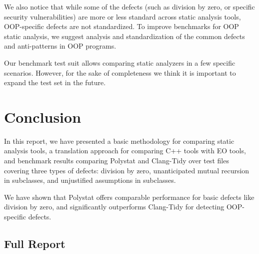 We also notice that while some of the defects (such as division by zero, or specific security vulnerabilities) are more or less standard across static analysis tools, OOP-specific defects are not standardized. To improve benchmarks for OOP static analysis, we suggest analysis and standardization of the common defects and anti-patterns in OOP programs.

Our benchmark test suit allows comparing static analyzers in a few specific scenarios. However, for the sake of completeness we think it is important to expand the test set in the future.

\section{Conclusion}

In this report, we have presented a basic methodology for comparing static analysis tools, a translation approach for comparing C++ tools with EO tools, and benchmark results comparing Polystat and Clang-Tidy over test files covering three types of defects: division by zero, unanticipated mutual recursion in subclasses, and unjustified assumptions in subclasses.

We have shown that Polystat offers comparable performance for basic defects like division by zero, and significantly outperforms Clang-Tidy for detecting OOP-specific defects.


\printbibliography

\onecolumn
\appendix
\subsection{Full Report}

